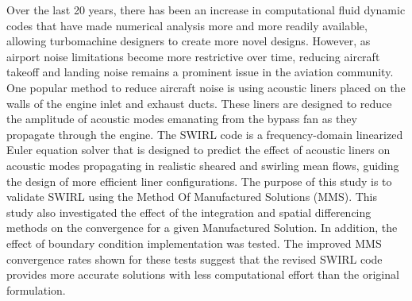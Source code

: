 Over the last 20 years, there has been an increase in computational fluid dynamic 
codes that have made numerical analysis more and more readily available, allowing
turbomachine designers to create more novel designs. However, as airport noise
limitations become more restrictive over time, reducing aircraft 
takeoff and landing noise remains a prominent issue in the aviation community. 
One popular method to reduce aircraft noise is using acoustic liners placed on 
the walls of the engine inlet and exhaust ducts. These liners are designed to 
reduce the amplitude of acoustic modes emanating from the bypass fan as they 
propagate through the engine. The SWIRL code is a frequency-domain linearized 
Euler equation solver that is designed to predict the effect of acoustic liners
on acoustic modes propagating in realistic sheared and swirling mean flows, guiding
the design of more efficient liner configurations. The purpose of this study is
to validate SWIRL using the Method Of Manufactured Solutions (MMS). This study 
also investigated the effect of the integration and spatial differencing methods 
on the convergence for a given Manufactured Solution. In addition, the effect 
of boundary condition implementation was tested.  The improved MMS convergence
rates shown for these tests suggest that the revised SWIRL code provides more 
accurate solutions with less computational effort than the original formulation.


